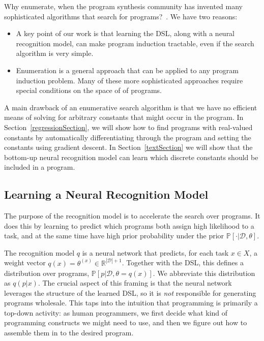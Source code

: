 \documentclass{article}
\newcommand{\probability}{\mathds{P}} %
\begin{document}
Why enumerate, when the program synthesis community has invented many
sophisticated algorithms that search for programs?~\cite{solar2008program,schkufza2013stochastic,feser2015synthesizing,osera2015type,polozov2015flashmeta}.
We have two reasons:%
\begin{itemize}
\item A key point of our work is that learning the DSL, along with a neural recognition model, can make program induction tractable, even if the search algorithm is very simple.
\item Enumeration is a general approach that can be applied to any program induction problem. Many of these more sophisticated approaches require special conditions on
  the space of of programs.
\end{itemize}
A main drawback of an enumerative search algorithm is that we have no
efficient means of solving for arbitrary constants that might occur in the
program. In Section~\ref{regressionSection},
we will show how to find programs with real-valued constants
by automatically differentiating through the program and setting the constants using gradient descent.
In Section~\ref{textSection}
we will show that the bottom-up neural recognition model can learn
which discrete constants should be included in a program.







\subsection{Learning a Neural Recognition Model}\label{recognitionSection}

The purpose of the recognition model is to accelerate the search over
programs.  It does this by learning to predict which programs both 
assign high likelihood to a task, and at the same time 
have high prior probability under the prior $\probability[\cdot |\mathcal{D},\theta]$.

The recognition model $q$ is a neural network that predicts,
for each task $x\in X$, a weight vector $q(x) = \theta^{(x)}\in \mathbb{R}^{|\mathcal{D}| + 1}$.
Together with the DSL, this defines a distribution over programs,
$\probability[p|\mathcal{D},\theta = q(x)]$.
We abbreviate this distribution as $q(p|x)$.
The crucial aspect of this framing is that the neural network
leverages the structure of the learned DSL,
so it is \emph{not} responsible for
generating programs wholesale.
This taps into the intuition that programming is primarily a top-down activity:
as human programmers, we first decide what kind of
programming constructs we might need to use,
and then we figure out how to assemble them in to the desired program.
\end{document}
